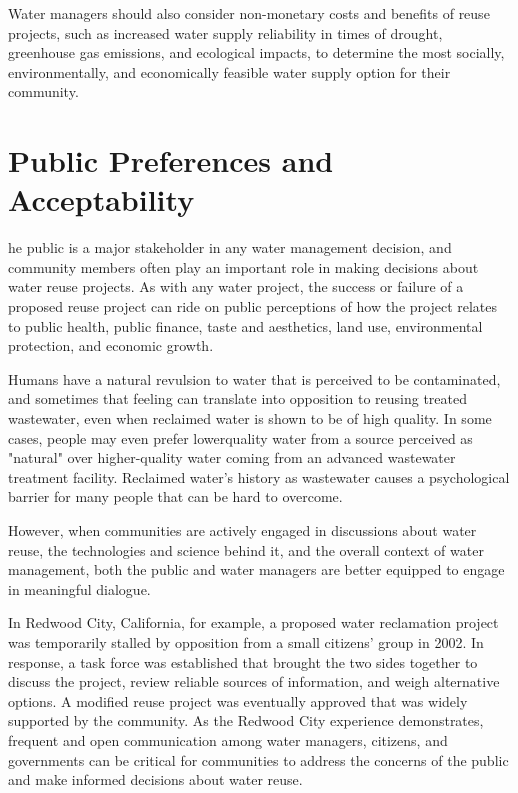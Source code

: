 \documentclass[10pt]{article}
\begin{document}
Water managers should also consider non-monetary costs and benefits of reuse projects, such as increased water supply reliability in times of drought, greenhouse gas emissions, and ecological impacts, to determine the most socially, environmentally, and economically feasible water supply option for their community.

\section{Public Preferences and Acceptability}
he public is a major stakeholder in any water management decision, and community members often play an important role in making decisions about water reuse projects. As with any water project, the success or failure of a proposed reuse project can ride on public perceptions of how the project relates to public health, public finance, taste and aesthetics, land use, environmental protection, and economic growth.

Humans have a natural revulsion to water that is perceived to be contaminated, and sometimes that feeling can translate into opposition to reusing treated wastewater, even when reclaimed water is shown to be of high quality. In some cases, people may even prefer lowerquality water from a source perceived as "natural" over higher-quality water coming from an advanced wastewater treatment facility. Reclaimed water's history as wastewater causes a psychological barrier for many people that can be hard to overcome.

However, when communities are actively engaged in discussions about water reuse, the technologies and science behind it, and the overall context of water management, both the public and water managers are better equipped to engage in meaningful dialogue.

In Redwood City, California, for example, a proposed water reclamation project was temporarily stalled by opposition from a small citizens' group in 2002. In response, a task force was established that brought the two sides together to discuss the project, review reliable sources of information, and weigh alternative options. A modified reuse project was eventually approved that was widely supported by the community. As the Redwood City experience demonstrates, frequent and open communication among water managers, citizens, and governments can be critical for communities to address the concerns of the public and make informed decisions about water reuse.
\end{document}

